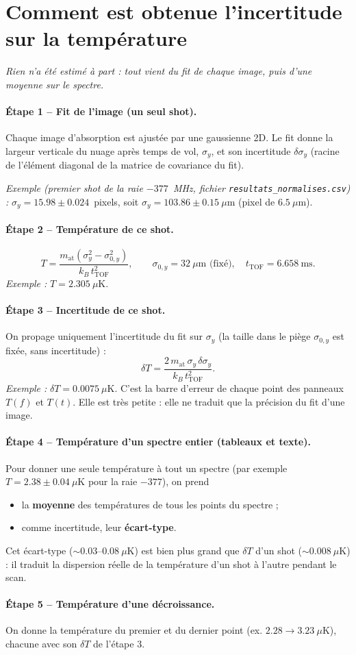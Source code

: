 \documentclass[11pt]{article}
\begin{document}
\section*{Comment est obtenue l'incertitude sur la température}
\emph{Rien n'a été estimé à part : tout vient du fit de chaque image, puis d'une moyenne sur le spectre.}

\paragraph{Étape 1 -- Fit de l'image (un seul shot).}
Chaque image d'absorption est ajustée par une gaussienne 2D. Le fit donne la largeur verticale du nuage après temps de vol,
$\sigma_y$, et son incertitude $\delta\sigma_y$ (racine de l'élément diagonal de la matrice de covariance du fit).

\emph{Exemple (premier shot de la raie $-377$~MHz, fichier \texttt{resultats\_normalises.csv}) :}
$\sigma_y = 15.98 \pm 0.024$~pixels, soit $\sigma_y = 103.86 \pm 0.15~\mu$m (pixel de $6.5~\mu$m).

\paragraph{Étape 2 -- Température de ce shot.}
\[
T = \frac{m_{\text{at}}\left(\sigma_y^2-\sigma_{0,y}^2\right)}{k_B\,t_{\text{TOF}}^2},
\qquad \sigma_{0,y}=32~\mu\text{m (fixé)},\quad t_{\text{TOF}}=6.658~\text{ms}.
\]
\emph{Exemple :} $T = 2.305~\mu$K.

\paragraph{Étape 3 -- Incertitude de ce shot.}
On propage uniquement l'incertitude du fit sur $\sigma_y$ (la taille dans le piège $\sigma_{0,y}$ est fixée, sans incertitude) :
\[
\delta T = \frac{2\,m_{\text{at}}\,\sigma_y\,\delta\sigma_y}{k_B\,t_{\text{TOF}}^2}.
\]
\emph{Exemple :} $\delta T = 0.0075~\mu$K. C'est la barre d'erreur de chaque point des panneaux $T(f)$ et $T(t)$.
Elle est très petite : elle ne traduit que la précision du fit d'une image.

\paragraph{Étape 4 -- Température d'un spectre entier (tableaux et texte).}
Pour donner une seule température à tout un spectre (par exemple $T=2.38\pm0.04~\mu$K pour la raie $-377$), on prend
\begin{itemize}
\item la \textbf{moyenne} des températures de tous les points du spectre ;
\item comme incertitude, leur \textbf{écart-type}.
\end{itemize}
Cet écart-type ($\sim0.03$--$0.08~\mu$K) est bien plus grand que $\delta T$ d'un shot ($\sim0.008~\mu$K) : il traduit
la dispersion réelle de la température d'un shot à l'autre pendant le scan.

\paragraph{Étape 5 -- Température d'une décroissance.}
On donne la température du premier et du dernier point (ex. $2.28\to3.23~\mu$K), chacune avec son $\delta T$ de l'étape 3.
\end{document}
